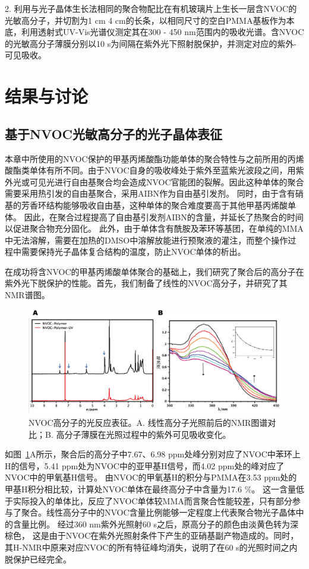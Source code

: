 2. 利用与光子晶体生长法相同的聚合物配比在有机玻璃片上生长一层含NVOC的光敏高分子，并切割为1 cm \text{$\times$} 4 cm的长条，以相同尺寸的空白PMMA基板作为本底，利用透射式UV-Vis光谱仪测定其在300 - 450 nm范围内的吸收光谱。含NVOC的光敏高分子薄膜分别以10 s为间隔在紫外光下照射脱保护，并测定对应的紫外-可见吸收。

\section{结果与讨论}
\subsection{基于NVOC光敏高分子的光子晶体表征}
本章中所使用的NVOC保护的甲基丙烯酸酯功能单体的聚合特性与之前所用的丙烯酸酯类单体有所不同。由于NVOC自身的吸收峰处于紫外至蓝紫光波段之间，用紫外光或可见光进行自由基聚合均会造成NVOC官能团的裂解。因此这种单体的聚合需要采用热引发的自由基聚合，采用AIBN作为自由基引发剂。
同时，由于含有硝基的芳香环结构能够吸收自由基，这种单体的聚合难度要高于其他甲基丙烯酸单体\cite{Schumers2009Are}。
因此，在聚合过程提高了自由基引发剂AIBN的含量，并延长了热聚合的时间以促进聚合物充分固化。
此外，由于单体含有酰胺及苯环等基团，在单纯的MMA中无法溶解，需要在加热的DMSO中溶解放能进行预聚液的灌注，而整个操作过程中需要保持光子晶体复合结构的温度，防止NVOC单体的析出。

在成功将含NVOC的甲基丙烯酸单体聚合的基础上，我们研究了聚合后的高分子在紫外光下脱保护的性能。首先，我们制备了线性的NVOC高分子，并研究了其NMR谱图。
\begin{figure}[htbp]
  \centering
  \includegraphics[width=\linewidth]{figures/ch4/NMR-IR.png}
  \caption{NVOC高分子的光反应表征。A. 线性高分子光照前后的NMR图谱对比；B. 高分子薄膜在光照过程中的紫外可见吸收变化。}
  \label{fig:NMR-IR}
\end{figure}

如图~\ref{fig:NMR-IR}A所示，聚合后的高分子中7.67、6.98 ppm处峰分别对应了NVOC中苯环上H的信号，5.41 ppm处为NVOC中的亚甲基H信号，而4.02 ppm处的峰对应了NVOC中的甲氧基H信号。
由NVOC的甲氧基H的积分与PMMA在3.53 ppm处的甲基H积分相比较，计算处NVOC单体在最终高分子中含量为17.6 \%。
这一含量低于实际投入的单体比，反应了NVOC单体较MMA而言聚合性能较差，只有部分参与了聚合。线性高分子中的NVOC含量比例能够一定程度上代表聚合物光子晶体中的含量比例。
经过360 nm紫外光照射60 s之后，原高分子的颜色由淡黄色转为深棕色，
这是由于NVOC在紫外光照射条件下产生的亚硝基副产物造成的\cite{Cui2011Polymer}。同时，其H-NMR中原来对应NVOC的所有特征峰均消失，说明了在60 s的光照时间之内脱保护已经完全。

